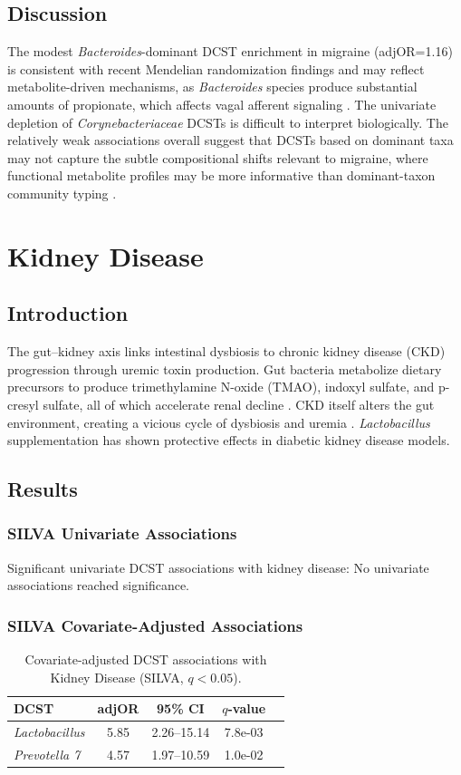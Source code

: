 \documentclass[11pt,a4paper]{article}
\begin{document}
\subsection{Discussion}
The modest \textit{Bacteroides}-dominant DCST enrichment in migraine (adjOR=1.16) is consistent with recent Mendelian randomization findings and may reflect metabolite-driven mechanisms, as \textit{Bacteroides} species produce substantial amounts of propionate, which affects vagal afferent signaling \cite{Gorenshtein2025_migraine,Cryan2012_gutbrain}. The univariate depletion of \textit{Corynebacteriaceae} DCSTs is difficult to interpret biologically. The relatively weak associations overall suggest that DCSTs based on dominant taxa may not capture the subtle compositional shifts relevant to migraine, where functional metabolite profiles may be more informative than dominant-taxon community typing \cite{Kappeter2023_migraine_FMT}.
\newpage

\section{Kidney Disease}
\subsection{Introduction}
The gut--kidney axis links intestinal dysbiosis to chronic kidney disease (CKD) progression through uremic toxin production. Gut bacteria metabolize dietary precursors to produce trimethylamine N-oxide (TMAO), indoxyl sulfate, and p-cresyl sulfate, all of which accelerate renal decline \cite{Tang2015_TMAO_CKD}. CKD itself alters the gut environment, creating a vicious cycle of dysbiosis and uremia \cite{Vaziri2013_CKD}. \textit{Lactobacillus} supplementation has shown protective effects in diabetic kidney disease models.

\subsection{Results}
\subsubsection{SILVA Univariate Associations}
Significant univariate DCST associations with kidney disease: No univariate associations reached significance.

\subsubsection{SILVA Covariate-Adjusted Associations}
\begin{table}[H]\centering\small
\caption{Covariate-adjusted DCST associations with Kidney Disease (SILVA, $q<0.05$).}\label{tab:Kidney_disease_adj}
\begin{tabular}{lcccc}
\toprule
DCST & adjOR & 95\% CI & $q$-value \\
\midrule
\textit{Lactobacillus} & 5.85 & 2.26--15.14 & 7.8e-03 \\
\textit{Prevotella 7} & 4.57 & 1.97--10.59 & 1.0e-02 \\
\bottomrule
\end{tabular}\end{table}
\end{document}
